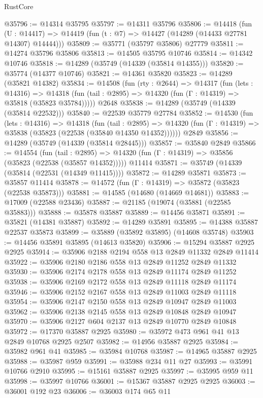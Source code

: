 \begin{lexlean}{RustCore}
\begin{coremodule}
@35796 := @14314 @35795
@35797 := @14311 @35796
@35806 := @14418
    (fun (U : @14417) => @14419 (fun (t : @7) => @14427 (@14289 (@14433 @27781 @14307) @14444)))
@35809 := @35771 (@35797 @35806) @27779
@35811 := @14274 @35796 @35806
@35813 := @14505 @35795 @10746
@35814 := @14342 @10746
@35818 := @14289 (@35749 (@14339 (@35814 @14355)))
@35820 := @35774 (@14377 @10746)
@35821 := @14361 @35820
@35823 := @14289 (@35821 @14382)
@35834 := @14508
    (fun (rty : @2644) =>
    @14317
      (fun (lets : @14316) =>
      @14318 (fun (tail : @2895) => @14320 (fun (Γ : @14319) => @35818 (@35823 @35784)))))
    @2648
@35838 := @14289 (@35749 (@14339 (@35814 @22532)))
@35840 := @22539 @35779 @27784
@35852 := @14530
    (fun (lets : @14316) =>
    @14318
      (fun (tail : @2895) =>
      @14320 (fun (Γ : @14319) => @35838 (@35823 (@22538 (@35840 @14350 @14352))))))
    @2849
@35856 := @14289 (@35749 (@14339 (@35814 @28445)))
@35857 := @35840 @2849
@35866 := @14554
    (fun (tail : @2895) => @14320 (fun (Γ : @14319) => @35856 (@35823 (@22538 (@35857 @14352)))))
    @11414
@35871 := @35749 (@14339 (@35814 (@22531 (@14349 @11415))))
@35872 := @14289 @35871
@35873 := @35857 @11414
@35878 := @14572 (fun (Γ : @14319) => @35872 (@35823 (@22538 @35873)))
@35881 := @14585 (@14680 (@14669 @14681))
@35883 := @17009 (@22588 @23436)
@35887 := @21185 (@19074 (@35881 (@22585 @35883)))
@35888 := @35878 @35887
@35889 := @14456 @35871
@35891 := @35821 (@14381 @35887)
@35892 := @14289 @35891
@35895 := @14388 @35887 @22537 @35873
@35899 := @35889 (@35892 @35895) (@14608 @35748)
@35903 := @14456 @35891 @35895 (@14613 @35820)
@35906 := @15294 @35887 @2925 @2925
@35914 := @35906 @2188 @2194 @558 @13 @2849 @11332 @2849 @11414
@35922 := @35906 @2180 @2186 @558 @13 @2849 @11252 @2849 @11332
@35930 := @35906 @2174 @2178 @558 @13 @2849 @11174 @2849 @11252
@35938 := @35906 @2169 @2172 @558 @13 @2849 @11118 @2849 @11174
@35946 := @35906 @2152 @2167 @558 @13 @2849 @11003 @2849 @11118
@35954 := @35906 @2147 @2150 @558 @13 @2849 @10947 @2849 @11003
@35962 := @35906 @2138 @2145 @558 @13 @2849 @10848 @2849 @10947
@35970 := @35906 @2127 @604 @2137 @13 @2849 @10770 @2849 @10848
@35972 := @17370 @35887 @2925
@35980 := @35972 @473 @961 @41 @13 @2849 @10768 @2925 @2507
@35982 := @14956 @35887 @2925
@35984 := @35982 @961 @41
@35985 := @35984 @10768
@35987 := @14965 @35887 @2925
@35988 := @35987 @959
@35991 := @35988 @234 @11 @27
@35993 := @35991 @10766 @2910
@35995 := @15161 @35887 @2925
@35997 := @35995 @959 @11
@35998 := @35997 @10766
@36001 := @15367 @35887 @2925 @2925
@36003 := @36001 @192 @23
@36006 := @36003 @174 @65 @11

\end{coremodule}
\end{lexlean}
